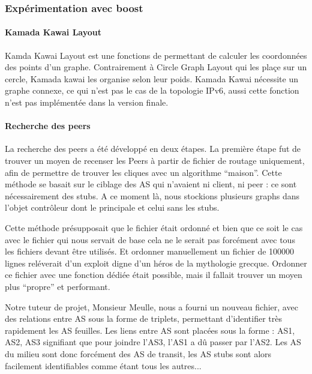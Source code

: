 \subsubsection{Expérimentation avec boost}

\paragraph{Kamada Kawai Layout}
Kamda Kawai Layout est une fonctions de \boost permettant de calculer les coordonn\'ees des points d'un graphe. Contrairement \`a Circle Graph Layout qui les pla\c ce sur un cercle, Kamada kawai les organise selon leur poids.
Kamada Kawai n\'ecessite un graphe connexe, ce qui n'est pas le cas de la topologie IPv6, aussi cette fonction n'est pas impl\'ement\'ee dans la version finale.

\paragraph{Recherche des peers\\}
\par La recherche des peers a été développé en deux étapes. La première étape fut de trouver un moyen de recenser les Peers à partir de fichier de routage uniquement, afin de permettre de trouver les cliques avec un algorithme ``maison''. Cette méthode se basait sur le ciblage des AS qui n'avaient ni client, ni peer : ce sont n\'ecessairement des stubs. A ce moment là, nous stockions plusieurs graphs dans l'objet contrôleur dont le principale et celui sans les stubs.

Cette méthode présupposait que le fichier était ordonné et bien que ce soit le cas avec le fichier qui nous servait de base cela ne le serait pas forcément avec tous les fichiers devant être utilisés. Et ordonner manuellement un fichier de 100000 lignes reléverait d'un exploit digne d'un héros de la mythologie grecque. Ordonner ce fichier avec une fonction dédiée était possible, mais il fallait trouver un moyen plus ``propre'' et performant.

\par Notre tuteur de projet, Monsieur Meulle, nous a fourni un nouveau fichier, avec des relations entre AS sous la forme de triplets, permettant d'identifier tr\`es rapidement les AS feuilles.
Les liens entre AS sont plac\'ees sous la forme : {AS1, AS2, AS3} signifiant que pour joindre l'AS3, l'AS1 a dû passer par l'AS2. Les AS du milieu sont donc forcément des AS de transit, les AS stubs sont alors facilement identifiables comme \'etant tous les autres... 

